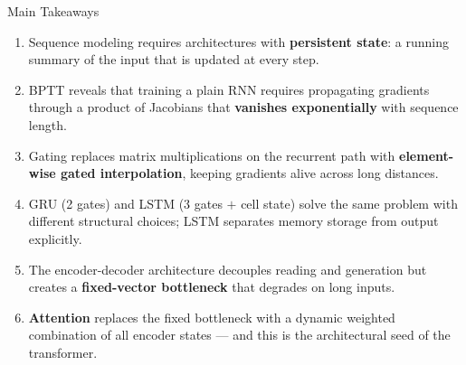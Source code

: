\documentclass[aspectratio=169]{beamer}
\begin{document}
\begin{frame}{Main Takeaways}
\begin{enumerate}
    \item Sequence modeling requires architectures with \textbf{persistent state}:
          a running summary of the input that is updated at every step.
    \item BPTT reveals that training a plain RNN requires propagating gradients
          through a product of Jacobians that \textbf{vanishes exponentially} with sequence length.
    \item Gating replaces matrix multiplications on the recurrent path with
          \textbf{element-wise gated interpolation}, keeping gradients alive across long distances.
    \item GRU (2 gates) and LSTM (3 gates $+$ cell state) solve the same problem
          with different structural choices; LSTM separates memory storage from output explicitly.
    \item The encoder-decoder architecture decouples reading and generation
          but creates a \textbf{fixed-vector bottleneck} that degrades on long inputs.
    \item \textbf{Attention} replaces the fixed bottleneck with a dynamic weighted combination
          of all encoder states --- and this is the architectural seed of the transformer.
\end{enumerate}
\end{frame}
%
\end{document}
